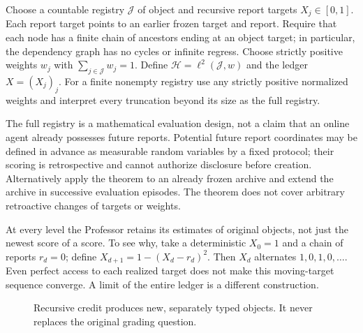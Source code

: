 \documentclass[11pt]{article}
\begin{document}
\begin{definition}
Choose a countable registry $\mathcal J$ of object and recursive report targets $X_j\in[0,1]$. Each report target points to an earlier frozen target and report. Require that each node has a finite chain of ancestors ending at an object target; in particular, the dependency graph has no cycles or infinite regress. Choose strictly positive weights $w_j$ with $\sum_{j\in\mathcal J}w_j=1$. Define $\mathcal H=\ell^2(\mathcal J,w)$ and the ledger $X=(X_j)_j$. For a finite nonempty registry use any strictly positive normalized weights and interpret every truncation beyond its size as the full registry.
\end{definition}
The full registry is a mathematical evaluation design, not a claim that an online agent already possesses future reports. Potential future report coordinates may be defined in advance as measurable random variables by a fixed protocol; their scoring is retrospective and cannot authorize disclosure before creation. Alternatively apply the theorem to an already frozen archive and extend the archive in successive evaluation episodes. The theorem does not cover arbitrary retroactive changes of targets or weights.

At every level the Professor retains its estimates of original objects, not just the newest score of a score. To see why, take a deterministic $X_0=1$ and a chain of reports $r_d=0$; define $X_{d+1}=1-(X_d-r_d)^2$. Then $X_d$ alternates $1,0,1,0,\ldots$. Even perfect access to each realized target does not make this moving-target sequence converge. A limit of the entire ledger is a different construction.

\begin{figure}[ht]
\centering
{}
\caption{Recursive credit produces new, separately typed objects. It never replaces the original grading question.}
\end{figure}
\end{document}

